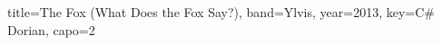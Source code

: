 \documentclass{../../tex/bekki-leadsheet}
\begin{document}
\begin{song}[transpose-capo=true]{title={The Fox (What Does the Fox Say?)}, band={Ylvis}, year={2013}, key={C# Dorian}, capo={2}}

  

\end{song}
\end{document}
